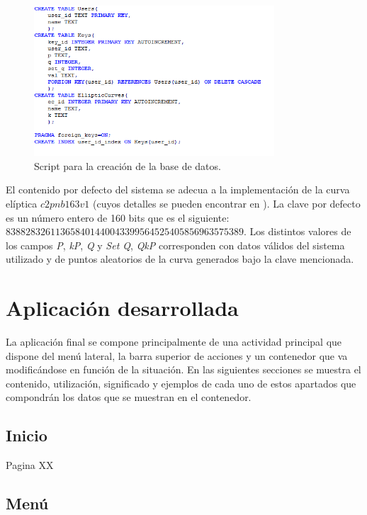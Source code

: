 \documentclass[../PFC.tex]{subfiles}
\begin{document}
\begin{figure}[H]
  \centering
  \includegraphics[width=0.8\textwidth]{./img/databaseScript}
  \caption{Script para la creación de la base de datos.}
  \label{img:databaseScript}
\end{figure}

El contenido por defecto del sistema se adecua a la implementación de la curva elíptica \(c2pnb163v1\) (cuyos detalles se pueden encontrar en \cite{definicionCurvasF2M}). La clave por defecto es un número entero de 160 bits que es el siguiente: \(838828326113658401440043399564525405856963575389\). Los distintos valores de los campos \textit{P}, \textit{kP}, \textit{Q} y \textit{Set Q}, \textit{QkP} corresponden con datos válidos del sistema utilizado y de puntos aleatorios de la curva generados bajo la clave mencionada.

\section{Aplicación desarrollada}
\label{App:Aplicación desarrollada}

La aplicación final se compone principalmente de una actividad principal que dispone del menú lateral, la barra superior de acciones y un contenedor que va modificándose en función de la situación. En las siguientes secciones se muestra el contenido, utilización, significado y ejemplos de cada uno de estos apartados que compondrán los datos que se muestran en el contenedor.

\subsection{Inicio}
\label{App:AD:Inicio}

Pagina XX

\subsection{Menú}
\label{App:Menu}
\end{document}
